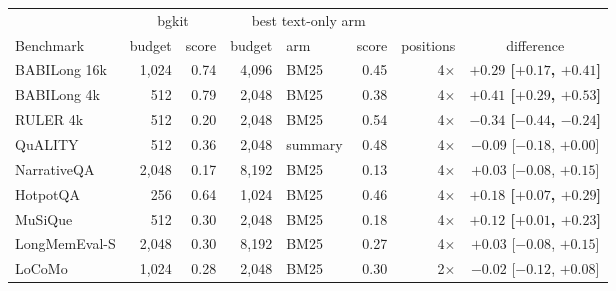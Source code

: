 \begin{tabular}{lrrrlrrc}
\toprule
 & \multicolumn{2}{c}{bgkit} & \multicolumn{3}{c}{best text-only arm} & & \\
\cmidrule(lr){2-3}\cmidrule(lr){4-6}
Benchmark & budget & score & budget & arm & score & positions & difference \\
\midrule
BABILong 16k & 1,024 & 0.74 & 4,096 & BM25 & 0.45 & 4$\times$ & \textbf{$+0.29$ \scriptsize[$+0.17$, $+0.41$]} \\
BABILong 4k & 512 & 0.79 & 2,048 & BM25 & 0.38 & 4$\times$ & \textbf{$+0.41$ \scriptsize[$+0.29$, $+0.53$]} \\
RULER 4k & 512 & 0.20 & 2,048 & BM25 & 0.54 & 4$\times$ & \textbf{$-0.34$ \scriptsize[$-0.44$, $-0.24$]} \\
QuALITY & 512 & 0.36 & 2,048 & summary & 0.48 & 4$\times$ & $-0.09$ \scriptsize[$-0.18$, $+0.00$] \\
NarrativeQA & 2,048 & 0.17 & 8,192 & BM25 & 0.13 & 4$\times$ & $+0.03$ \scriptsize[$-0.08$, $+0.15$] \\
HotpotQA & 256 & 0.64 & 1,024 & BM25 & 0.46 & 4$\times$ & \textbf{$+0.18$ \scriptsize[$+0.07$, $+0.29$]} \\
MuSiQue & 512 & 0.30 & 2,048 & BM25 & 0.18 & 4$\times$ & \textbf{$+0.12$ \scriptsize[$+0.01$, $+0.23$]} \\
LongMemEval-S & 2,048 & 0.30 & 8,192 & BM25 & 0.27 & 4$\times$ & $+0.03$ \scriptsize[$-0.08$, $+0.15$] \\
LoCoMo & 1,024 & 0.28 & 2,048 & BM25 & 0.30 & 2$\times$ & $-0.02$ \scriptsize[$-0.12$, $+0.08$] \\
\bottomrule
\end{tabular}

